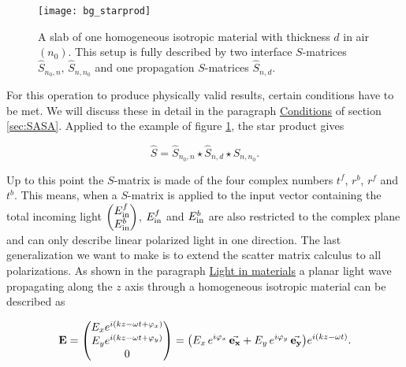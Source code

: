 \begin{figure}[H]
    \centering
    \texttt{[image: bg\_starprod]}
    \caption{A slab of one homogeneous isotropic material with thickness $d$ in air $(n_0)$. This setup is fully described by two interface $S$-matrices 
    $\hat S_{n_0,n}, \, \hat S_{n,n_0}$
    and one propagation $S$-matrices
    $\hat S_{n,d}$.}
    \label{fig:bg:star_prod}
\end{figure}

For this operation to produce physically valid results, certain conditions have to be met. We will discuss these in detail in the paragraph \hyperref[par:conditions]{Conditions} of section \ref{sec:SASA}.
Applied to the example of figure \ref{fig:bg:star_prod}, the star product gives

\begin{equation}
    \hat S = \hat S_{n_0, n} \star \hat S_{n, d} \star \hat S_{n, n_0}.
\end{equation}

Up to this point the $S$-matrix is made of the four complex numbers $t^f$, $r^b$, $r^f$ and $t^b$. This means, when a $S$-matrix is applied to the input vector containing the total incoming light  
$
\begin{pmatrix}
    E^f_{\mathrm{in}} \\
    E^b_{\mathrm{in}}
\end{pmatrix}
$,
$E^f_{\mathrm{in}}$ and $E^b_{\mathrm{in}}$ are also restricted to the complex plane and can only describe linear polarized light in one direction. The last generalization we want to make is to extend the scatter matrix calculus to all polarizations. As shown in the paragraph \hyperref[par:light_in_materials]{Light in materials} a planar light wave propagating along the $z$ axis through a homogeneous isotropic material can be described as

\begin{equation}
   \vb E =
   \begin{pmatrix}
       E_x e^{i(kz - \omega t + \varphi_x)}\\
       E_y e^{i(kz - \omega t + \varphi_y)}\\
       0\\
   \end{pmatrix}
   =
   \qty(E_x \, e^{i \varphi_x} \, \va{e_x} +
        E_y \, e^{i \varphi_y} \, \va{e_y})
       e^{i(kz - \omega t)}.
\end{equation}
\\

